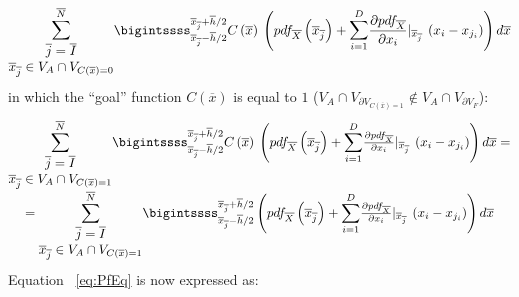 \begin{equation}
\mathlarger{\sum}_{\begin{matrix}
\overline{j}=\overline{I} \\ \overline{x}_{\overline{j}} \in V_{A} \cap V_{C(\overline{x})=0} \end{matrix}}^{\overline{N}}
\bigintssss_{\overline{x}_{\overline{j}} - \overline{h}/2}^{\overline{x}_{\overline{j}} + \overline{h}/2} C\left ( \overline{x} \right )\:
\left ( pdf_{\overline{X}}\left ( \overline{x}_{\overline{j}} \right ) +
\mathlarger{\sum}_{i=1}^{D} \frac{\partial pdf_{\overline{X}}}{\partial x_{i}}|_{\overline{x}_{\overline{j}}} \: \left ( x_{i} - x_{j_{i}} \right ) \right )   d\overline{x}
\end{equation}
in which the  ``goal''  function $C(\overline{x})$ is equal to $1$ ($V_{A} \cap V_{\partial V_{C(\overline{x})=1}} \notin V_{A} \cap V_{\partial V_{F}}$):
\begin{equation}
\begin{matrix}
\mathlarger{\sum}_{\begin{matrix}
\overline{j}=\overline{I} \\ \overline{x}_{\overline{j}} \in V_{A} \cap V_{C(\overline{x})=1} \end{matrix}}^{\overline{N}}
\bigintssss_{\overline{x}_{\overline{j}} - \overline{h}/2}^{\overline{x}_{\overline{j}} + \overline{h}/2} C\left ( \overline{x} \right )\:
\left ( pdf_{\overline{X}}\left ( \overline{x}_{\overline{j}} \right ) +
\mathlarger{\sum}_{i=1}^{D} \frac{\partial pdf_{\overline{X}}}{\partial x_{i}}|_{\overline{x}_{\overline{j}}} \: \left ( x_{i} - x_{j_{i}} \right ) \right )   d\overline{x} =
\\
= \mathlarger{\sum}_{\begin{matrix}
\overline{j}=\overline{I} \\ \overline{x}_{\overline{j}} \in V_{A} \cap V_{C(\overline{x})=1} \end{matrix}}^{\overline{N}}
\bigintssss_{\overline{x}_{\overline{j}} - \overline{h}/2}^{\overline{x}_{\overline{j}} + \overline{h}/2}
\left ( pdf_{\overline{X}}\left ( \overline{x}_{\overline{j}} \right ) +
\mathlarger{\sum}_{i=1}^{D} \frac{\partial pdf_{\overline{X}}}{\partial x_{i}}|_{\overline{x}_{\overline{j}}} \: \left ( x_{i} - x_{j_{i}} \right ) \right )   d\overline{x}
\end{matrix}
\end{equation}
Equation ~\ref{eq:PfEq} is now expressed as:
